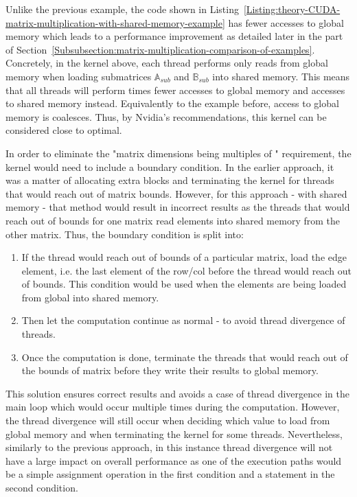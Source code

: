Unlike the previous example, the code shown in Listing~\ref{Listing:theory-CUDA-matrix-multiplication-with-shared-memory-example} has fewer accesses to global memory which leads to a performance improvement as detailed later in the \textit{} part of Section~\ref{Subsubsection:matrix-multiplication-comparison-of-examples}. Concretely, in the kernel above, each thread performs only  reads from global memory when loading submatrices $ \mathbb{A}_{sub} $ and $ \mathbb{B}_{sub} $ into shared memory. This means that all threads will perform  times fewer accesses to global memory and  accesses to shared memory instead. Equivalently to the example before, access to global memory is coalesces. Thus, by Nvidia's recommendations, this kernel can be considered close to optimal.

\par In order to eliminate the "matrix dimensions being multiples of " requirement, the kernel would need to include a boundary condition. In the earlier approach, it was a matter of allocating extra blocks and terminating the kernel for threads that would reach out of matrix bounds. However, for this approach - with shared memory - that method would result in incorrect results as the threads that would reach out of bounds for one matrix read elements into shared memory from the other matrix. Thus, the boundary condition is split into:

\begin{enumerate}
	\item If the thread would reach out of bounds of a particular matrix, load the edge element, i.e. the last element of the row/col before the thread would reach out of bounds. This condition would be used when the elements are being loaded from global into shared memory.
	\item Then let the computation continue as normal - to avoid thread divergence of threads.
	\item Once the computation is done, terminate the threads that would reach out of the bounds of matrix  before they write their results to global memory.
\end{enumerate}

This solution ensures correct results and avoids a case of thread divergence in the main loop which would occur multiple times during the computation. However, the thread divergence will still occur when deciding which value to load from global memory and when terminating the kernel for some threads. Nevertheless, similarly to the previous approach, in this instance thread divergence will not have a large impact on overall performance as one of the execution paths would be a simple assignment operation in the first condition and a  statement in the second condition.

